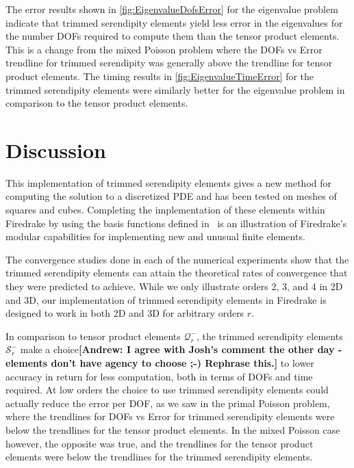 \documentclass[format=acmsmall,screen,timestamp=false,a4paper]{acmart}
\newcommand\akg[1]{\textbf{\textcolor[rgb]{.5,0,1}{[Andrew: #1]}}}
\newcommand{\calQ}{\mathcal{Q}}
\newcommand{\calS}{\mathcal{S}}
\begin{document}
The error results shown in \cref{fig:EigenvalueDofsError} for the eigenvalue problem indicate that trimmed serendipity elements yield less error in the eigenvalues for the number DOFs required to compute them than the tensor product elements.  This is a change from the mixed Poisson problem where the DOFs vs Error trendline for trimmed serendipity was generally above the trendline for tensor product elements.  %
The timing results in \ref{fig:EigenvalueTimeError} for the trimmed serendipity elements were similarly better for the eigenvalue problem in comparison to the tensor product elements.


\section{Discussion}

This implementation of trimmed serendipity elements gives a new method for computing the solution to a discretized PDE and has been tested on meshes of squares and cubes.  Completing the implementation of these elements within Firedrake by using the basis functions defined in~\cite{gillette2019computational} is an illustration of Firedrake's modular capabilities for implementing new and unusual finite elements. 

The convergence studies done in each of the numerical experiments show that the trimmed serendipity elements can attain the theoretical rates of convergence that they were predicted to achieve.  While we only illustrate orders 2, 3, and 4 in 2D and 3D, our implementation of trimmed serendipity elements in Firedrake is designed to work in both 2D and 3D for arbitrary orders $r$.  

In comparison to tensor product elements $\mathcal{Q}^-_r$, the trimmed serendipity elements $\mathcal{S}^-_r$ make a choice\akg{I agree with Josh's comment the other day - elements don't have agency to choose ;-)  Rephrase this.} to lower accuracy in return for less computation, both in terms of DOFs and time required.  At low orders the choice to use trimmed serendipity elements could actually reduce the error per DOF, as we saw in the primal Poisson problem, where the trendlines for DOFs vs Error for trimmed serendipity elements were below the trendlines for the tensor product elements.  In the mixed Poisson case however, the opposite was true, and the trendlines for the tensor product elements were below the trendlines for the trimmed serendipity elements.
\end{document}
